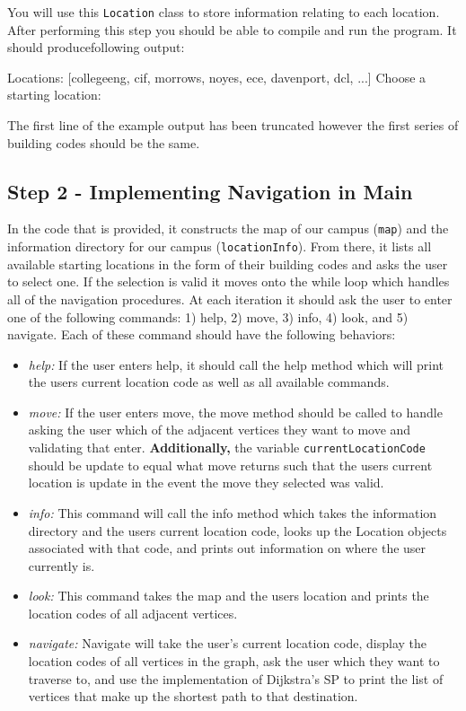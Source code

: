 \documentclass[a4paper]{article}
\begin{document}
You will use this \lstinline|Location| class to store information relating to each location. After performing this step you should be able
to compile and run the program. It should producefollowing output:
\begin{shell}
Locations: [collegeeng, cif, morrows, noyes, ece, davenport, dcl, ...]
Choose a starting location: 
\end{shell}

The first line of the example output has been truncated however the first series of building codes
should be the same. 

\subsection{Step 2 - Implementing Navigation in Main}\label{sec:nav}

 In the code that is provided, it constructs the map of our campus
 (\lstinline|map|) and the information directory for our campus
 (\lstinline|locationInfo|). From there, it lists all available starting
 locations in the form of their building codes and asks the user to select one.
 If the selection is valid it moves onto the while loop which handles all of
 the navigation procedures. At each iteration it should ask the user to enter
 one of the following commands: 1) help, 2) move, 3) info, 4) look, and 5)
 navigate. Each of these command should have the following behaviors:

\begin{itemize}
    \item \textit{help:} If the user enters help, it should call the help method which will print the users current location code as well as all available commands.
    \item \textit{move:} If the user enters move, the move method should be called to handle asking the user which of the adjacent vertices they want to move and validating that enter. \textbf{Additionally,} the variable \lstinline|currentLocationCode| should be update to equal what move returns such that the users current location is update in the event the move they selected was valid. 
    \item \textit{info:} This command will call the info method which takes the information directory and the users current location code, looks up the Location objects associated with that code, and prints out information on where the user currently is.
    \item \textit{look:} This command takes the map and the users location and prints the location codes of all adjacent vertices.
    \item \textit{navigate:} Navigate will take the user's current location code, display the location codes of all vertices in the graph, ask the user which they want to traverse to, and use the implementation of Dijkstra's SP to print the list of vertices that make up the shortest path to that destination.
\end{itemize}
\end{document}
